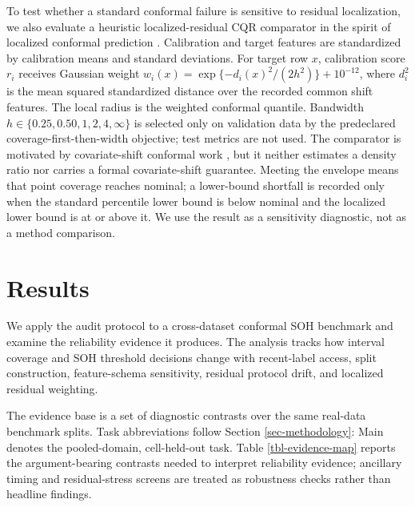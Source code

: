\documentclass[
  number,
  preprint]{elsarticle}
\begin{document}
To test whether a standard conformal failure is sensitive to residual
localization, we also evaluate a heuristic localized-residual CQR
comparator in the spirit of localized conformal prediction
\citep{guan2022localized}. Calibration and target features are
standardized by calibration means and standard deviations. For target
row \(x\), calibration score \(r_i\) receives Gaussian weight
\(w_i(x)=\exp\{-d_i(x)^2/(2h^2)\}+10^{-12}\), where \(d_i^2\) is the
mean squared standardized distance over the recorded common shift
features. The local radius is the weighted conformal quantile. Bandwidth
\(h\in\{0.25,0.50,1,2,4,\infty\}\) is selected only on validation data
by the predeclared coverage-first-then-width objective; test metrics are
not used. The comparator is motivated by covariate-shift conformal work
\citep{tibshirani2019covariate}, but it neither estimates a density
ratio nor carries a formal covariate-shift guarantee. Meeting the
envelope means that point coverage reaches nominal; a lower-bound
shortfall is recorded only when the standard percentile lower bound is
below nominal and the localized lower bound is at or above it. We use
the result as a sensitivity diagnostic, not as a method comparison.

\section{Results}\label{sec-results}

We apply the audit protocol to a cross-dataset conformal SOH benchmark
and examine the reliability evidence it produces. The analysis tracks
how interval coverage and SOH threshold decisions change with
recent-label access, split construction, feature-schema sensitivity,
residual protocol drift, and localized residual weighting.

The evidence base is a set of diagnostic contrasts over the same
real-data benchmark splits. Task abbreviations follow Section
\ref{sec-methodology}: Main denotes the pooled-domain, cell-held-out
task. Table \ref{tbl-evidence-map} reports the argument-bearing
contrasts needed to interpret reliability evidence; ancillary timing and
residual-stress screens are treated as robustness checks rather than
headline findings.
\end{document}
